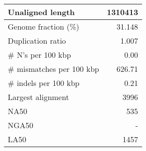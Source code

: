 \documentclass[12pt,a4paper]{article}
\begin{document}
\begin{table}[ht]
\begin{center}
\begin{tabular}{|l*{1}{|r}|}
Unaligned length & 1310413 \\ \hline
Genome fraction (\%) & 31.148 \\ \hline
Duplication ratio & 1.007 \\ \hline
\# N's per 100 kbp & 0.00 \\ \hline
\# mismatches per 100 kbp & 626.71 \\ \hline
\# indels per 100 kbp & 0.21 \\ \hline
Largest alignment & 3996 \\ \hline
NA50 & 535 \\ \hline
NGA50 & - \\ \hline
LA50 & 1457 \\ \hline
\end{tabular}
\end{center}
\end{table}
\end{document}

